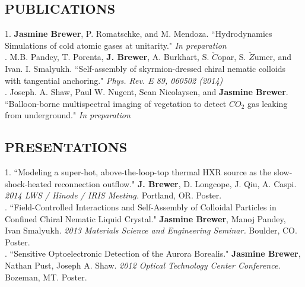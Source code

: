 \documentclass[11pt,a4paper]{article}
\begin{document}
\subsection*{PUBLICATIONS}

1. \textbf{Jasmine Brewer}, P. Romatschke, and M. Mendoza. ``Hydrodynamics Simulations of cold atomic gases at unitarity." \textit{In preparation}\\

. M.B. Pandey, T. Porenta, \textbf{J. Brewer}, A. Burkhart, S. $\check{C}$opar, S. $\check{Z}$umer, and Ivan. I. Smalyukh. ``Self-assembly of skyrmion-dressed chiral nematic colloids with tangential anchoring." \textit{ Phys. Rev. E 89, 060502 (2014) } \\

. Joseph. A. Shaw, Paul W. Nugent, Sean Nicolaysen, and \textbf{Jasmine Brewer}. ``Balloon-borne multispectral imaging of vegetation to detect $CO_2$ gas leaking from underground." \textit{In preparation} \\

\subsection*{PRESENTATIONS}

1. ``Modeling a super-hot, above-the-loop-top thermal HXR source as the slow-shock-heated reconnection outflow." \textbf{J. Brewer}, D. Longcope, J. Qiu, A. Caspi. \textit{2014 LWS / Hinode / IRIS Meeting.} Portland, OR. Poster. \\

. ``Field-Controlled Interactions and Self-Assembly of Colloidal Particles in Confined Chiral Nematic Liquid Crystal." \textbf{Jasmine Brewer}, Manoj Pandey, Ivan Smalyukh. \textit{2013 Materials Science and Engineering Seminar.}  Boulder, CO. Poster. \\

. ``Sensitive Optoelectronic Detection of the Aurora Borealis." \textbf{Jasmine Brewer}, Nathan Pust, Joseph A. Shaw. \textit{2012 Optical Technology Center Conference.} Bozeman, MT. Poster. \\
\end{document}
